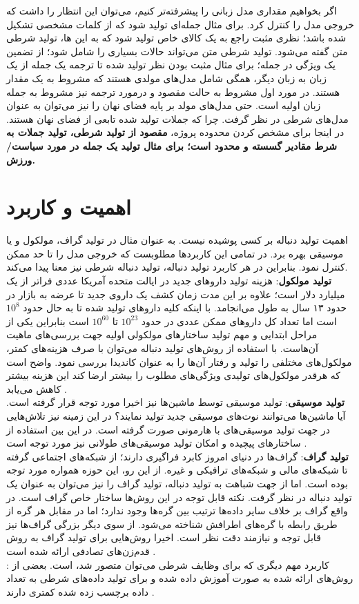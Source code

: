 اگر بخواهیم مقداری \task{} مدل زبانی را پیشرفته‌تر کنیم، می‌توان این انتظار را داشت که خروجی مدل را کنترل کرد. برای مثال جمله‌ای تولید شود که از کلمات مشخصی تشکیل شده باشد؛ نظری مثبت راجع به یک کالای خاص تولید شود که به این \task{}‌ها، تولید شرطی متن گفته می‌شود. تولید شرطی متن می‌تواند حالات بسیاری را شامل شود؛ از تضمین یک ویژگی در جمله؛ برای مثال مثبت بودن نظر تولید شده تا ترجمه یک جمله از یک زبان به زبان دیگر، همگی شامل مدل‌های مولدی هستند که مشروط به یک مقدار هستند. در مورد اول مشروط به حالت مقصود و درمورد ترجمه نیز مشروط به جمله زبان اولیه است. حتی مدل‌های  مولد بر پایه فضای نهان را نیز می‌توان به عنوان مدل‌های شرطی در نظر گرفت. چرا که جملات تولید شده تابعی از فضای نهان هستند. در اینجا برای مشخص کردن محدوده پروژه،
{\bf
مقصود از تولید شرطی، تولید جملات به شرط مقادیر گسسته و محدود است؛ برای مثال تولید یک جمله در مورد سیاست/ورزش.}
\section{اهمیت و کاربرد}
اهمیت تولید دنباله بر کسی پوشیده نیست. به عنوان مثال در تولید گراف، مولکول و یا موسیقی بهره برد. در تمامی این کاربردها مطلوبست که خروجی مدل را تا حد ممکن کنترل نمود. بنابراین در هر کاربرد تولید دنباله، تولید دنباله شرطی نیز معنا پیدا می‌کند.
\\
{\bf تولید مولکول}:
هزینه تولید دارو‌های جدید در ایالت متحده آمریکا عددی فراتر از یک میلیارد دلار است؛ علاوه بر این مدت زمان کشف یک داروی جدید تا عرضه به بازار در حدود ۱۳ سال به طول می‌انجامد. با اینکه کلیه دارو‌های تولید شده تا به حال حدود $10^8$ است اما تعداد کل دارو‌های ممکن عددی در حدود $10^{23}$ تا $10^{60}$ است بنابراین یکی از مراحل ابتدایی و مهم تولید ساختارهای مولکولی اولیه جهت بررسی‌های ماهیت آن‌هاست. با استفاده از روش‌های تولید دنباله می‌توان با صرف هزینه‌های کمتر، مولکول‌های مختلفی را تولید و رفتار آن‌ها را به عنوان کاندیدا بررسی نمود. واضح است که هرقدر مولکول‌های تولیدی ویژگی‌های مطلوب را بیشتر ارضا کند این هزینه بیشتر کاهش می‌یابد \cite{molecule}.
\\
{\bf تولید موسیقی}:
تولید موسیقی توسط ماشین‌ها نیز اخیرا مورد توجه قرار گرفته است. آیا ماشین‌ها می‌توانند نوت‌های موسیقی جدید تولید نمایند؟ در این زمینه نیز تلاش‌هایی در جهت تولید موسیقی‌های با هارمونی صورت گرفته است. در این بین استفاده از ساختارهای پیچیده و امکان تولید موسیقی‌های طولانی نیز مورد توجه است \cite{vae_music, music}.
\\
{\bf تولید گراف}:
\task{}
گراف‌ها در دنیای امروز کابرد فراگیری دارند؛ از شبکه‌های اجتماعی گرفته تا شبکه‌های مالی و شبکه‌های ترافیکی و غیره. از این رو،‌ این حوزه همواره مورد توجه بوده است. اما از جهت شباهت به تولید دنباله، تولید گراف را نیز می‌توان به عنوان یک \task{} تولید دنباله در نظر گرفت. نکته قابل توجه در این روش‌ها ساختار خاص گراف است. در واقع گراف بر خلاف سایر داده‌ها ترتیب بین گره‌ها وجود ندارد؛‌ اما در مقابل هر گره از طریق رابطه با گره‌های اطرافش شناخته می‌شود. از سوی دیگر بزرگی گراف‌ها نیز قابل توجه و نیازمند دقت نظر است. اخیرا روش‌هایی برای تولید گراف به روش قدم‌زن‌های تصادفی ارائه شده است \cite{deep_walk}.
\\
{\bf {}}:
کاربرد مهم دیگری که برای وظایف شرطی می‌توان متصور شد، \augmentation{} است. بعضی از روش‌های ارائه شده به صورت
آموزش داده شده و برای تولید داده‌های شرطی به تعداد داده برچسب زده شده کمتری دارند \cite{cvae_semi}.
